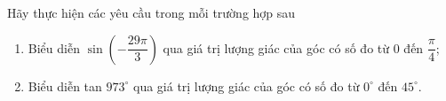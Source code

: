 \begin{ex}%
	Hãy  thực hiện các yêu cầu trong mỗi trường hợp sau
	\begin{enumerate}
		\item Biểu diễn $\sin \left(-\dfrac{29\pi}{3} \right)$ qua giá trị lượng giác của góc có số đo từ 0 đến $\dfrac{\pi}{4} $; 
		\item Biểu diễn tan $973^\circ $ qua giá trị  lượng giác của góc có số đo từ $0^\circ $ đến $45^\circ $.
	\end{enumerate}
\end{ex}

